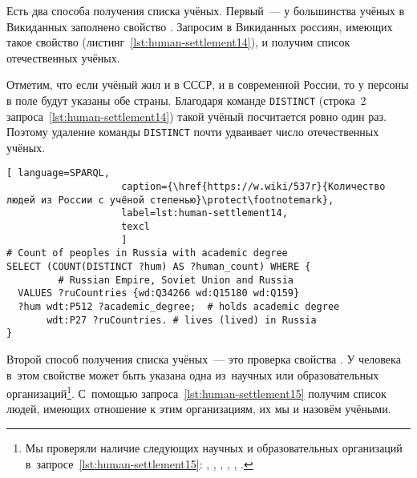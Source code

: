 Есть два способа получения списка учёных. 
Первый~--- у большинства учёных в Викиданных заполнено свойство . 
Запросим в Викиданных россиян, имеющих такое свойство (листинг~\ref{lst:human-settlement14}), 
и получим список отечественных учёных. 


Отметим, что если учёный жил и в СССР, и в современной России, 
то у персоны в поле  будут указаны обе страны.  
Благодаря команде \lstinline|DISTINCT| (строка~2 запроса~\ref{lst:human-settlement14}) 
такой учёный посчитается ровно один раз. 
Поэтому удаление команды \lstinline|DISTINCT| почти удваивает число отечественных учёных. 

\begin{lstlisting}[ language=SPARQL, 
                    caption={\href{https://w.wiki/537r}{Количество людей из России с учёной степенью}\protect\footnotemark},
                    label=lst:human-settlement14,
                    texcl 
                    ]
# Count of peoples in Russia with academic degree
SELECT (COUNT(DISTINCT ?hum) AS ?human_count) WHERE {
         # Russian Empire, Soviet Union and Russia
  VALUES ?ruCountries {wd:Q34266 wd:Q15180 wd:Q159}
  ?hum wdt:P512 ?academic_degree;  # holds academic degree 
       wdt:P27 ?ruCountries. # lives (lived) in Russia
}
\end{lstlisting}%

Второй способ получения списка учёных~--- это проверка свойства . 
У человека в~этом свойстве может быть указана одна из~научных или образовательных организаций\footnote{%
%
%
Мы проверяли наличие следующих научных и образовательных организаций
в~запросе~\ref{lst:human-settlement15}: 
, , 
, , 
, .%
}.  %
С~помощью запроса~\ref{lst:human-settlement15} 
получим список людей, имеющих отношение к этим организациям, 
их мы и назовём учёными. 

